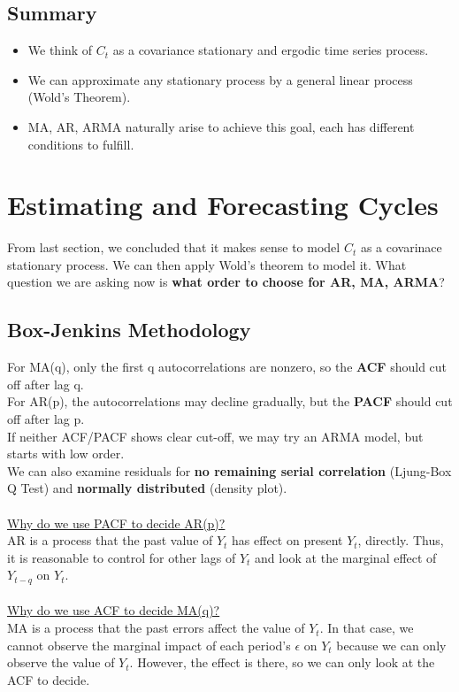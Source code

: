 \documentclass{article}
\begin{document}
\subsection{Summary}
\begin{itemize}
    \item We think of $C_t$ as a covariance stationary and ergodic time series process.
    \item We can approximate any stationary process by a general linear process (Wold's Theorem).
    \item MA, AR, ARMA naturally arise to achieve this goal, each has different conditions to fulfill.
\end{itemize}


\section{Estimating and Forecasting Cycles}
From last section, we concluded that it makes sense to model $C_t$ as a covarinace stationary process. We can then apply Wold's theorem to model it. What question we are asking now is \textbf{what order to choose for AR, MA, ARMA}?

\subsection{Box-Jenkins Methodology}
For MA(q), only the first q autocorrelations are nonzero, so the \textbf{ACF} should cut off after lag q.\\
For AR(p), the autocorrelations may decline gradually, but the \textbf{PACF} should cut off after lag p.\\
If neither ACF/PACF shows clear cut-off, we may try an ARMA model, but starts with low order.\\
We can also examine residuals for \textbf{no remaining serial correlation} (Ljung-Box Q Test) and \textbf{normally distributed} (density plot).\\
\\
\underline{Why do we use PACF to decide AR(p)?}\\
AR is a process that the past value of $Y_t$ has effect on present $Y_t$, directly. Thus, it is reasonable to control for other lags of $Y_t$ and look at the marginal effect of $Y_{t-q}$ on $Y_t$.\\
\\
\underline{Why do we use ACF to decide MA(q)?}\\
MA is a process that the past errors affect the value of $Y_t$. In that case, we cannot observe the marginal impact of each period's $\epsilon$ on $Y_t$ because we can only observe the value of $Y_t$. However, the effect is there, so we can only look at the ACF to decide.
\end{document}

